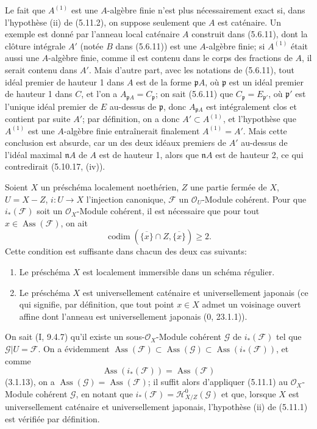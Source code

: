 \begin{remark}[5.11.3]
\label{IV.2.s5.11.3-fr}
Le fait que $A^{(1)}$ est une $A$-algèbre finie n'est plus nécessairement exact
si, dans l'hypothèse (ii) de (5.11.2), on suppose seulement que $A$ est
caténaire. Un exemple est donné par l'anneau local caténaire $A$ construit dans
(5.6.11), dont la clôture intégrale $A'$ (notée $B$ dans (5.6.11)) est une
$A$-algèbre finie; si $A^{(1)}$ était aussi une $A$-algèbre finie, comme il est
contenu dans le corps des fractions de $A$, il serait contenu dans $A'$. Mais
d'autre part, avec les notations de (5.6.11), tout idéal premier de hauteur 1
dans $A$ est de la forme $\mathfrak pA$, où $\mathfrak p$ est un idéal premier
de hauteur 1 dans $C$, et l'on a
$A_{\mathfrak pA}=C_\mathfrak p$; on sait (5.6.11) que
$C_\mathfrak p=E_{\mathfrak p'}$, où $\mathfrak p'$ est l'unique idéal
premier de $E$ au-dessus de $\mathfrak p$, donc $A_{\mathfrak pA}$ est
intégralement clos et contient par suite $A'$; par définition, on a donc
$A'\subset A^{(1)}$, et l'hypothèse que $A^{(1)}$ est une $A$-algèbre finie
entraînerait finalement $A^{(1)}=A'$. Mais cette conclusion est absurde, car un
des deux idéaux premiers de $A'$ au-dessus de l'idéal maximal $\mathfrak nA$ de
$A$ est de hauteur 1, alors que $\mathfrak nA$ est de hauteur 2, ce qui
contredirait (5.10.17, (iv)).
\end{remark}

\begin{corollary}[5.11.4]
\label{IV.2.s5.11.4-fr}
Soient $X$ un préschéma localement noethérien, $Z$ une partie fermée de $X$,
$U=X-Z$, $i:U\to X$ l'injection canonique, $\mathcal F$ un
$\mathcal O_U$-Module cohérent. Pour que $i_*(\mathcal F)$ soit un
$\mathcal O_X$-Module cohérent, il est nécessaire que pour tout
$x\in\operatorname{Ass}(\mathcal F)$, on ait
\[
\operatorname{codim}(\overline{\{x\}}\cap Z,\overline{\{x\}})\geq2.
\]
Cette condition est suffisante dans chacun des deux cas suivants:
\begin{enumerate}
\item[(i)] Le préschéma $X$ est localement immersible dans un schéma régulier.
\item[(ii)] Le préschéma $X$ est universellement caténaire et universellement
japonais (ce qui signifie, par définition, que tout point $x\in X$ admet un
voisinage ouvert affine dont l'anneau est universellement japonais (0,
23.1.1)).
\end{enumerate}
\end{corollary}

On sait (I, 9.4.7) qu'il existe un sous-$\mathcal O_X$-Module cohérent
$\mathcal G$ de $i_*(\mathcal F)$ tel que $\mathcal G\vert U=\mathcal F$. On a
évidemment
$\operatorname{Ass}(\mathcal F)\subset\operatorname{Ass}(\mathcal G)
\subset\operatorname{Ass}(i_*(\mathcal F))$, et comme
\[
\operatorname{Ass}(i_*(\mathcal F))=\operatorname{Ass}(\mathcal F)
\]
(3.1.13), on a $\operatorname{Ass}(\mathcal G)=\operatorname{Ass}(\mathcal F)$;
il suffit alors d'appliquer (5.11.1) au $\mathcal O_X$-Module cohérent
$\mathcal G$, en notant que $i_*(\mathcal F)=\mathcal H^0_{X/Z}(\mathcal G)$
et que, lorsque $X$ est universellement caténaire et universellement japonais,
l'hypothèse (ii) de (5.11.1) est vérifiée par définition.

